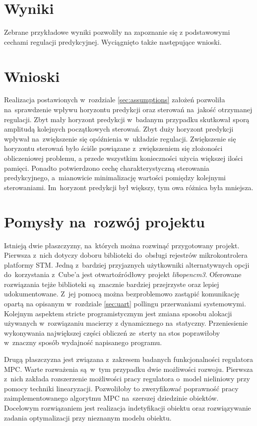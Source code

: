 \section{Wyniki}
Zebrane przykładowe wyniki pozwoliły na zapoznanie się z podstawowymi cechami regulacji
predykcyjnej. Wyciągnięto także następujące wnioski.

\section{Wnioski}
Realizacja postawionych w~rozdziale \ref{sec:assumptions} założeń pozwoliła na~sprawdzenie
wpływu horyzontu predykcji oraz sterowań na~jakość otrzymanej regulacji. Zbyt mały horyzont
predykcji w~badanym przypadku skutkował sporą amplitudą kolejnych początkowych sterowań. Zbyt
duży horyzont predykcji wpływał na~zwiększenie się opóźnienia w~układzie regulacji. Zwiększenie się
horyzontu sterowań było ściśle powiązane z~zwiększeniem się złożoności obliczeniowej problemu,
a przede wszystkim konieczności użycia większej ilości pamięci.
Ponadto potwierdzono cechę charakterystyczną sterowania predykcyjnego, a~mianowicie minimalizację
wartości pomiędzy kolejnymi sterowaniami. Im~horyzont predykcji był większy, tym owa różnica
była mniejsza.

\section{Pomysły na~rozwój projektu}
Istnieją dwie płaszczyzny, na~których można rozwinąć przygotowany projekt. Pierwsza z~nich dotyczy
doboru biblioteki do~obsługi rejestrów mikrokontrolera platformy STM. Jedną z~bardziej przyjaznych
użytkowniki alternatywnych opcji do~korzystania z~Cube'a jest otwartoźródłowy projekt
\textit{libopencm3}. Oferowane rozwiązania tejże biblioteki są~znacznie bardziej przejrzyste
oraz lepiej udokumentowane. Z~jej pomocą można bezproblemowo zastąpić komunikację opartą na
opisanym w~rozdziale \ref{sec:uart} pollingu przerwaniami systemowymi. Kolejnym aspektem
stricte programistycznym jest zmiana sposobu alokacji używanych w~rozwiązaniu macierzy z
dynamicznego na~statyczny. Przeniesienie wykonywania największej części obliczeń ze~sterty
na stos poprawiłoby w~znaczny sposób wydajność napisanego programu.

Drugą płaszczyzna jest związana z~zakresem badanych funkcjonalności regulatora MPC. Warte
rozważenia są~w~tym przypadku dwie możliwości rozwoju. Pierwsza z~nich zakłada rozszerzenie
możliwości pracy regulatora o~model nieliniowy przy pomocy techniki linearyzacji. Pozwoliłoby
to zweryfikować poprawność pracy zaimplementowanego algorytmu MPC na~szerszej dziedzinie
obiektów. Docelowym rozwiązaniem jest realizacja indetyfikacji obiektu oraz rozwiązywanie
zadania optymalizacji przy nieznanym modelu obiektu. 